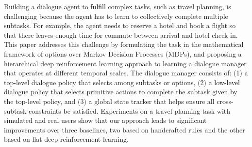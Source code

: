 Building a dialogue agent to fulfill complex tasks, such as travel planning, is challenging because the agent has to learn to collectively complete multiple subtasks. For example, the agent needs to reserve a hotel and book a flight so that there leaves enough time for commute between arrival and hotel check-in. This paper addresses this challenge by formulating the task in the mathematical framework of options over Markov Decision Processes (MDPs), and proposing a hierarchical deep reinforcement learning approach to learning a dialogue manager that operates at different temporal scales. The dialogue manager consists of: (1) a top-level dialogue policy that selects among subtasks or options, (2) a low-level dialogue policy that selects primitive actions to complete the subtask given by the top-level policy, and (3) a global state tracker that helps ensure all cross-subtask constraints be satisfied. Experiments on a travel planning task with simulated and real users show that our approach leads to significant improvements over three baselines, two based on handcrafted rules and the other based on flat deep reinforcement learning.
